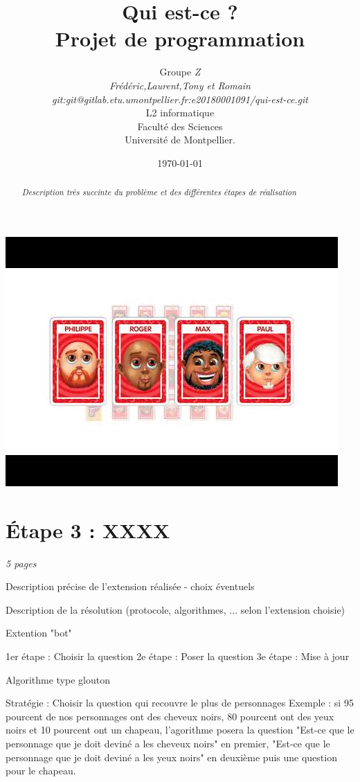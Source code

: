 \documentclass[a4paper]{article}
\title{  Qui est-ce ?\\         %
  Projet de programmation}
\author{Groupe \emph{Z}\\
  \emph{Frédéric,Laurent,Tony et Romain}\\
  \emph{git:git@gitlab.etu.umontpellier.fr:e20180001091/qui-est-ce.git}\\
  L2 informatique\\
  Faculté des Sciences\\
Université de Montpellier.}
\date{\today}
\begin{document}
\maketitle                    %

\begin{center}               %
  \includegraphics[scale=1]{img.jpg}   %
\end{center}

\begin{abstract}     %

  \emph{Description très succinte du problème et des différentes étapes de réalisation}

\end{abstract}


\section{Étape 3 : XXXX}

\emph{5 pages}

Description précise de l'extension réalisée - choix éventuels

Description de la résolution (protocole, algorithmes, ... selon l'extension choisie)


Extention "bot"

1er étape : Choisir la question
2e étape : Poser la question
3e étape : Mise à jour

Algorithme type glouton

Stratégie : Choisir la question qui recouvre le plus de personnages
Exemple : si 95 pourcent de nos personnages ont des cheveux noirs, 80 pourcent ont des yeux noirs et 10 pourcent ont un chapeau, l'agorithme posera la question "Est-ce que le personnage que je doit deviné a les cheveux noirs" en premier, "Est-ce que le personnage que je doit deviné a les yeux noirs" en deuxième puis une question pour le chapeau.
\end{document}
